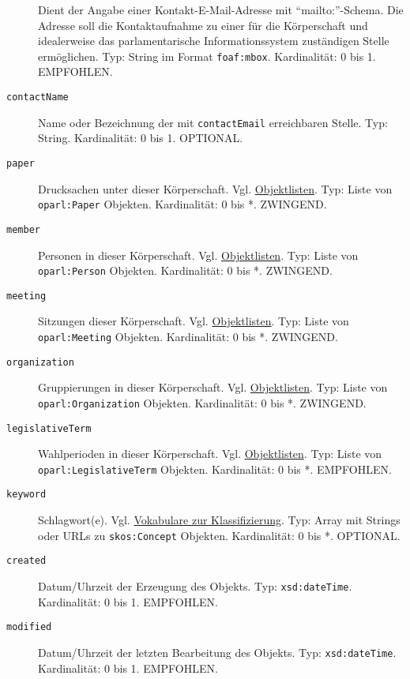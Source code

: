 \documentclass[,a4paper]{article}
\begin{document}
\begin{description}
Dient der Angabe einer Kontakt-E-Mail-Adresse mit ``mailto:''-Schema.
Die Adresse soll die Kontaktaufnahme zu einer für die Körperschaft und
idealerweise das parlamentarische Informationssystem zuständigen Stelle
ermöglichen. Typ: String im Format \texttt{foaf:mbox}. Kardinalität: 0
bis 1. EMPFOHLEN.
\item[\texttt{contactName}]
Name oder Bezeichnung der mit \texttt{contactEmail} erreichbaren Stelle.
Typ: String. Kardinalität: 0 bis 1. OPTIONAL.
\item[\texttt{paper}]
Drucksachen unter dieser Körperschaft. Vgl.
\hyperref[objektlisten]{Objektlisten}. Typ: Liste von
\texttt{oparl:Paper} Objekten. Kardinalität: 0 bis *. ZWINGEND.
\item[\texttt{member}]
Personen in dieser Körperschaft. Vgl.
\hyperref[objektlisten]{Objektlisten}. Typ: Liste von
\texttt{oparl:Person} Objekten. Kardinalität: 0 bis *. ZWINGEND.
\item[\texttt{meeting}]
Sitzungen dieser Körperschaft. Vgl.
\hyperref[objektlisten]{Objektlisten}. Typ: Liste von
\texttt{oparl:Meeting} Objekten. Kardinalität: 0 bis *. ZWINGEND.
\item[\texttt{organization}]
Gruppierungen in dieser Körperschaft. Vgl.
\hyperref[objektlisten]{Objektlisten}. Typ: Liste von
\texttt{oparl:Organization} Objekten. Kardinalität: 0 bis *. ZWINGEND.
\item[\texttt{legislativeTerm}]
Wahlperioden in dieser Körperschaft. Vgl.
\hyperref[objektlisten]{Objektlisten}. Typ: Liste von
\texttt{oparl:LegislativeTerm} Objekten. Kardinalität: 0 bis *.
EMPFOHLEN.
\item[\texttt{keyword}]
Schlagwort(e). Vgl. \hyperref[vokabulareux5fklassifizierung]{Vokabulare
zur Klassifizierung}. Typ: Array mit Strings oder URLs zu
\texttt{skos:Concept} Objekten. Kardinalität: 0 bis *. OPTIONAL.
\item[\texttt{created}]
Datum/Uhrzeit der Erzeugung des Objekts. Typ: \texttt{xsd:dateTime}.
Kardinalität: 0 bis 1. EMPFOHLEN.
\item[\texttt{modified}]
Datum/Uhrzeit der letzten Bearbeitung des Objekts. Typ:
\texttt{xsd:dateTime}. Kardinalität: 0 bis 1. EMPFOHLEN.
\end{description}

\end{document}
